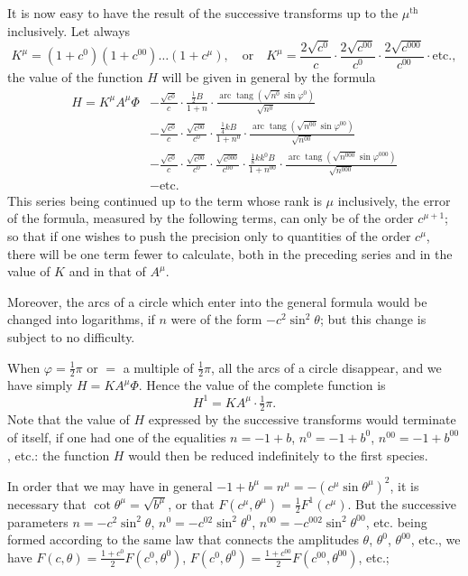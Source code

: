 \documentclass{article}
\begin{document}
It is now easy to have the result of the successive transforms up to the $\mu^{\text{th}}$ inclusively. Let always
\[ K^{\mu}=(1+c^{0})(1+c^{00})\ldots(1+c^{\mu}),\quad\text{or}\quad K^{\mu}=\frac{2\sqrt{c^{0}}}{c}\cdot\frac{2\sqrt{c^{00}}}{c^{0}}\cdot\frac{2\sqrt{c^{000}}}{c^{00}}\cdot\text{etc.}, \]
the value of the function $H$ will be given in general by the formula
\[ \begin{aligned} H=K^{\mu}A^{\mu}\Phi&-\frac{\sqrt{c^{0}}}{c}\cdot\frac{\tfrac{1}{2}B}{1+n}\cdot\frac{\operatorname{arc}\operatorname{tang}(\sqrt{n^{0}}\sin\varphi^{0})}{\sqrt{n^{0}}}\\ &-\frac{\sqrt{c^{0}}}{c}\cdot\frac{\sqrt{c^{00}}}{c^{0}}\cdot\frac{\tfrac{1}{4}kB}{1+n^{0}}\cdot\frac{\operatorname{arc}\operatorname{tang}(\sqrt{n^{00}}\sin\varphi^{00})}{\sqrt{n^{00}}}\\ &-\frac{\sqrt{c^{0}}}{c}\cdot\frac{\sqrt{c^{00}}}{c^{0}}\cdot\frac{\sqrt{c^{000}}}{c^{00}}\cdot\frac{\tfrac{1}{8}kk^{0}B}{1+n^{00}}\cdot\frac{\operatorname{arc}\operatorname{tang}(\sqrt{n^{000}}\sin\varphi^{000})}{\sqrt{n^{000}}}\\ &-\text{etc.} \end{aligned} \]
This series being continued up to the term whose rank is $\mu$ inclusively, the error of the formula, measured by the following terms, can only be of the order $c^{\mu+1}$; so that if one wishes to push the precision only to quantities of the order $c^{\mu}$, there will be one term fewer to calculate, both in the preceding series and in the value of $K$ and in that of $A^{\mu}$.

Moreover, the arcs of a circle which enter into the general formula would be changed into logarithms, if $n$ were of the form $-c^{2}\sin^{2}\theta$; but this change is subject to no difficulty.

When $\varphi=\frac{1}{2}\pi$ or $=$ a multiple of $\frac{1}{2}\pi$, all the arcs of a circle disappear, and we have simply $H=KA^{\mu}\Phi$. Hence the value of the complete function is
\[ H^{1}=KA^{\mu}\cdot\tfrac{1}{2}\pi. \]
Note that the value of $H$ expressed by the successive transforms would terminate of itself, if one had one of the equalities $n=-1+b$, $n^{0}=-1+b^{0}$, $n^{00}=-1+b^{00}$, etc.: the function $H$ would then be reduced indefinitely to the first species.

In order that we may have in general $-1+b^{\mu}=n^{\mu}=-(c^{\mu}\sin\theta^{\mu})^{2}$, it is necessary that $\cot\theta^{\mu}=\sqrt{b^{\mu}}$, or that $F(c^{\mu},\theta^{\mu})=\frac{1}{2}F^{1}(c^{\mu})$. But the successive parameters $n=-c^{2}\sin^{2}\theta$, $n^{0}=-c^{02}\sin^{2}\theta^{0}$, $n^{00}=-c^{002}\sin^{2}\theta^{00}$, etc. being formed according to the same law that connects the amplitudes $\theta$, $\theta^{0}$, $\theta^{00}$, etc., we have $F(c,\theta)=\frac{1+c^{0}}{2}F(c^{0},\theta^{0})$, $F(c^{0},\theta^{0})=\frac{1+c^{00}}{2}F(c^{00},\theta^{00})$, etc.;
\end{document}
